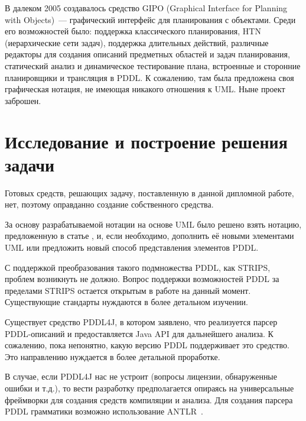 \documentclass[a4paper,14pt]{extreport}
\begin{document}
    В далеком 2005 создавалось средство GIPO (Graphical Interface for Planning with Objects)\cite{gipo}~--- графический интерфейс для планирования с объектами. Среди его возможностей было: поддержка классического планирования, HTN (иерархические  сети задач), поддержка длительных действий, различные редакторы для создания описаний предметных областей и задач планирования, статический анализ и динамическое тестирование плана, встроенные и сторонние планировщики и трансляция в PDDL. К сожалению, там была предложена своя графическая нотация, не имеющая никакого отношения к UML. Ныне проект заброшен.   
    
\section*{Исследование и построение решения задачи}
   
    Готовых средств, решающих задачу, поставленную в данной дипломной работе, нет, поэтому оправданно создание собственного средства. 

    За основу разрабатываемой нотации на основе UML было решено взять нотацию, предложенную в статье \cite{mal-manz}, и, если необходимо, дополнить её новыми элементами UML или предложить новый способ представления элементов PDDL. 

    С поддержкой преобразования такого подмножества PDDL, как STRIPS, проблем возникнуть не должно. Вопрос поддержки возможностей PDDL за пределами STRIPS остается открытым в работе на данный момент. Существующие стандарты нуждаются в более детальном изучении.

    Существует средство PDDL4J, в котором заявлено, что реализуется парсер PDDL-описаний и предоставляется Java API для дальнейшего анализа. К сожалению, пока непонятно, какую версию PDDL поддерживает это средство. Это направлению нуждается в более детальной проработке.
     
    В случае, если PDDL4J нас не устроит (вопросы лицензии, обнаруженные ошибки и т.д.), то вести разработку предполагается опираясь на универсальные фреймворки для создания средств компиляции и анализа. Для создания парсера PDDL грамматики возможно использование ANTLR~\cite{antlr}. 
    
    
\end{document}
